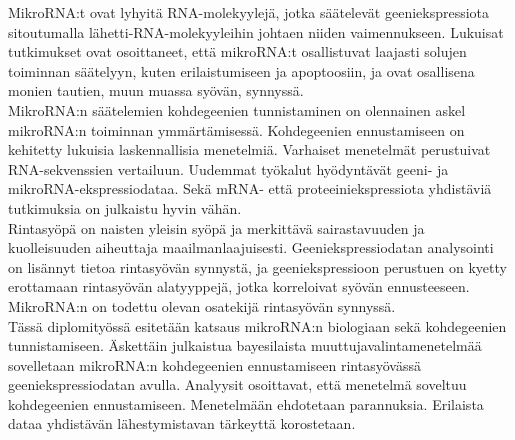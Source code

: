 \documentclass[english,12pt,a4paper,pdftex,elec,utf8]{aaltothesis}
\begin{document}
\professorship{--}
\begin{abstractpage}[finnish]

MikroRNA:t ovat lyhyitä RNA-molekyylejä, jotka säätelevät geeniekspressiota
sitoutumalla lähetti-RNA-molekyyleihin johtaen niiden vaimennukseen. Lukuisat
tutkimukset ovat osoittaneet, että mikroRNA:t osallistuvat laajasti solujen
toiminnan säätelyyn, kuten erilaistumiseen ja apoptoosiin, ja ovat
osallisena monien tautien, muun muassa syövän, synnyssä. \\

MikroRNA:n säätelemien kohdegeenien tunnistaminen on olennainen
askel mikroRNA:n toiminnan ymmärtämisessä. Kohdegeenien
ennustamiseen on kehitetty lukuisia laskennallisia menetelmiä. Varhaiset
menetelmät perustuivat RNA-sekvenssien vertailuun. Uudemmat työkalut
hyödyntävät geeni- ja mikroRNA-ekspressiodataa. Sekä mRNA- että
proteeiniekspressiota yhdistäviä tutkimuksia on julkaistu hyvin vähän. \\

Rintasyöpä on naisten yleisin syöpä ja merkittävä sairastavuuden ja
kuolleisuuden aiheuttaja maailmanlaajuisesti. Geeniekspressiodatan analysointi
on lisännyt tietoa rintasyövän synnystä, ja geeniekspressioon perustuen on
kyetty erottamaan rintasyövän alatyyppejä, jotka korreloivat syövän
ennusteeseen. MikroRNA:n on todettu olevan osatekijä rintasyövän synnyssä. \\

Tässä diplomityössä esitetään katsaus mikroRNA:n biologiaan sekä kohdegeenien
tunnistamiseen. Äskettäin julkaistua bayesilaista muuttujavalintamenetelmää
sovelletaan mikroRNA:n kohdegeenien ennustamiseen rintasyövässä
geeniekspressiodatan avulla. Analyysit osoittavat, että menetelmä soveltuu
kohdegeenien ennustamiseen. Menetelmään ehdotetaan parannuksia. Erilaista
dataa yhdistävän lähestymistavan tärkeyttä korostetaan.

\end{abstractpage}
\end{document}
